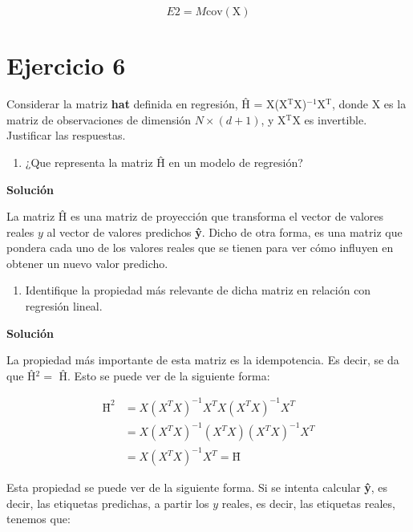 \documentclass[11pt,a4paper]{article}
\newcommand{\answer}{\noindent\textbf{Solución}}
\newcommand{\cov}{\text{cov}}
\begin{document}
\begin{equation}
	E2 = M \cov(\text{X})
\end{equation}

\section*{Ejercicio 6}

\noindent Considerar la matriz \textbf{hat} definida en regresión, Ĥ = X(X$^\text{T}$X)$^{-1}$X$^\text{T}$, donde X es la
matriz de observaciones de dimensión $N \times (d + 1)$, y X$^\text{T}$X es invertible. Justificar las respuestas.

\begin{enumerate}[label=\textit{\alph*})]
	\item ¿Que representa la matriz Ĥ en un modelo de regresión?
\end{enumerate}

\answer

La matriz Ĥ es una matriz de proyección que transforma el vector de valores reales $y$ al vector de valores predichos
\textbf{ŷ}. Dicho de otra forma, es una matriz que pondera cada uno de los valores reales que se tienen para ver cómo
influyen en obtener un nuevo valor predicho.

\begin{enumerate}[resume,label=\textit{\alph*})]
	\item Identifique la propiedad más relevante de dicha matriz en relación con regresión lineal.
\end{enumerate}

\answer

La propiedad más importante de esta matriz es la idempotencia. Es decir, se da que Ĥ$^2 = $ Ĥ. Esto se puede ver de la
siguiente forma:

\begin{equation}
\begin{split}
	\text{Ĥ}^2 &= X(X^TX)^{-1}X^TX(X^TX)^{-1}X^T \\
	&= X(X^TX)^{-1}(X^TX)(X^TX)^{-1}X^T \\
	&= X(X^TX)^{-1}X^T = \text{Ĥ}
\end{split}
\end{equation}

Esta propiedad se puede ver de la siguiente forma. Si se intenta calcular \textbf{ŷ}, es decir, las etiquetas
predichas, a partir los $y$ reales, es decir, las etiquetas reales, tenemos que:
\end{document}
